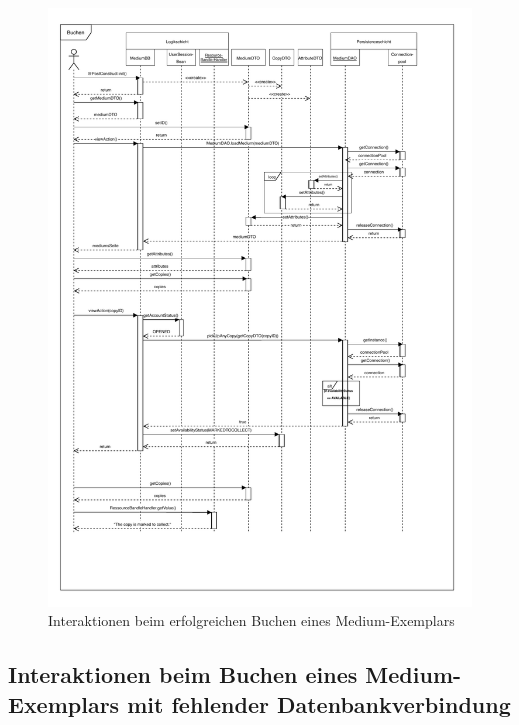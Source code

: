 \documentclass{article}
\begin{document}
\begin{figure}[h]
    \centering
    \includegraphics[width = 50em]{Sequenzdiagramm-success-v3.2}
    \caption{Interaktionen beim erfolgreichen Buchen eines Medium-Exemplars}
    \label{Sequenzdiagramm}
\end{figure}
\restoregeometry

\subsection{Interaktionen beim Buchen eines Medium-Exemplars mit fehlender Datenbankverbindung}
\end{document}
